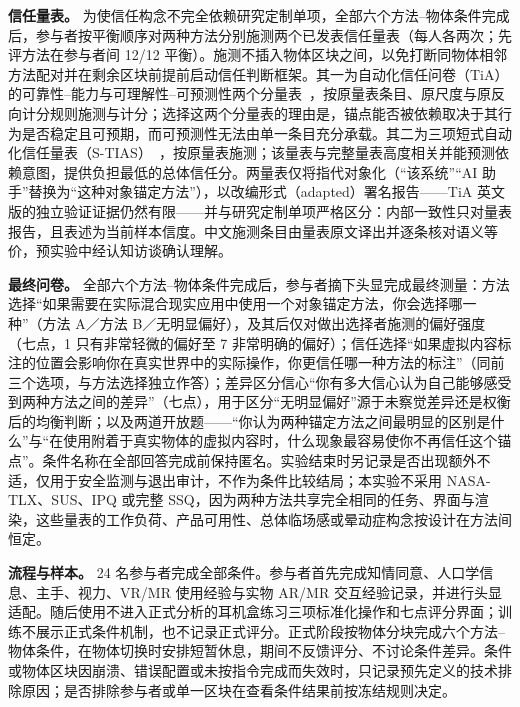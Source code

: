 \documentclass[review]{vgtc}
\begin{document}
\textbf{信任量表。} 为使信任构念不完全依赖研究定制单项，全部六个方法--物体条件完成后，参与者按平衡顺序对两种方法分别施测两个已发表信任量表（每人各两次；先评方法在参与者间 12/12 平衡）。施测不插入物体区块之间，以免打断同物体相邻方法配对并在剩余区块前提前启动信任判断框架。其一为自动化信任问卷（TiA）的可靠性--能力与可理解性--可预测性两个分量表~\cite{koerber2019tia}，按原量表条目、原尺度与原反向计分规则施测与计分；选择这两个分量表的理由是，锚点能否被依赖取决于其行为是否稳定且可预期，而可预测性无法由单一条目充分承载。其二为三项短式自动化信任量表（S-TIAS）~\cite{mcgrath2025stias}，按原量表施测；该量表与完整量表高度相关并能预测依赖意图，提供负担最低的总体信任分。两量表仅将指代对象化（“该系统”“AI 助手”替换为“这种对象锚定方法”），以改编形式（adapted）署名报告——TiA 英文版的独立验证证据仍然有限——并与研究定制单项严格区分：内部一致性只对量表报告，且表述为当前样本信度。中文施测条目由量表原文译出并逐条核对语义等价，预实验中经认知访谈确认理解。

\textbf{最终问卷。} 全部六个方法--物体条件完成后，参与者摘下头显完成最终测量：方法选择“如果需要在实际混合现实应用中使用一个对象锚定方法，你会选择哪一种”（方法 A／方法 B／无明显偏好），及其后仅对做出选择者施测的偏好强度（七点，1 只有非常轻微的偏好至 7 非常明确的偏好）；信任选择“如果虚拟内容标注的位置会影响你在真实世界中的实际操作，你更信任哪一种方法的标注”（同前三个选项，与方法选择独立作答）；差异区分信心“你有多大信心认为自己能够感受到两种方法之间的差异”（七点），用于区分“无明显偏好”源于未察觉差异还是权衡后的均衡判断；以及两道开放题——“你认为两种锚定方法之间最明显的区别是什么”与“在使用附着于真实物体的虚拟内容时，什么现象最容易使你不再信任这个锚点”。条件名称在全部回答完成前保持匿名。实验结束时另记录是否出现额外不适，仅用于安全监测与退出审计，不作为条件比较结局；本实验不采用 NASA-TLX、SUS、IPQ 或完整 SSQ，因为两种方法共享完全相同的任务、界面与渲染，这些量表的工作负荷、产品可用性、总体临场感或晕动症构念按设计在方法间恒定。

\textbf{流程与样本。} 24 名参与者完成全部条件。参与者首先完成知情同意、人口学信息、主手、视力、VR/MR 使用经验与实物 AR/MR 交互经验记录，并进行头显适配。随后使用不进入正式分析的耳机盒练习三项标准化操作和七点评分界面；训练不展示正式条件机制，也不记录正式评分。正式阶段按物体分块完成六个方法--物体条件，在物体切换时安排短暂休息，期间不反馈评分、不讨论条件差异。条件或物体区块因崩溃、错误配置或未按指令完成而失效时，只记录预先定义的技术排除原因；是否排除参与者或单一区块在查看条件结果前按冻结规则决定。
\end{document}
